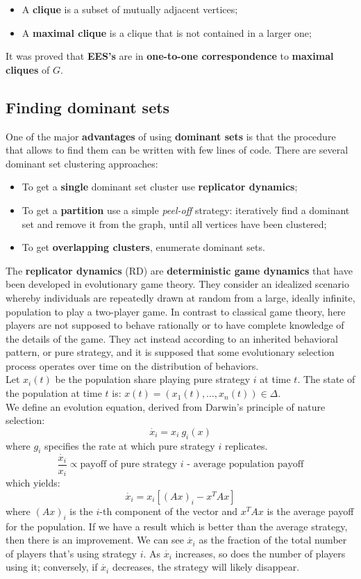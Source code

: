 \begin{itemize}
    \item A \textbf{clique} is a subset of mutually adjacent vertices;
    \item A \textbf{maximal clique} is a clique that is not contained in a larger one;
\end{itemize}

It was proved that \textbf{EES's} are in \textbf{one-to-one correspondence} to \textbf{maximal cliques} of $G$. 

\subsection{Finding dominant sets}
One of the major \textbf{advantages} of using \textbf{dominant sets} is that the procedure that allows to find them can be written with few lines of code. There are several dominant set clustering approaches:
\begin{itemize}
	\item To get a \textbf{single} dominant set cluster use \textbf{replicator dynamics};
	\item To get a \textbf{partition} use a simple \textit{peel-off} strategy: iteratively find a dominant set and remove it from the graph, until all vertices have been clustered;
	\item To get \textbf{overlapping clusters}, enumerate dominant sets. 
\end{itemize}
The \textbf{replicator dynamics} (RD) are \textbf{deterministic game dynamics} that have been developed in evolutionary game theory. They consider an idealized scenario whereby individuals are repeatedly drawn at random from a large, ideally infinite, population to play a two-player game. In contrast to classical game theory, here players are not supposed to behave rationally or to have complete knowledge of the details of the game. They act instead according to an inherited behavioral pattern, or pure strategy, and it is supposed that some evolutionary selection process operates over time on the distribution of behaviors.\\
Let $x_i(t)$ be the population share playing pure strategy $i$ at time $t$. The state of the population at time $t$ is: $x(t) = (x_1(t),\dots,x_n(t))\in\Delta$.\\
We define an evolution equation, derived from Darwin's principle of nature selection:
$$\dot{x_i} = x_i~g_i(x)$$
where $g_i$ specifies the rate at which pure strategy $i$ replicates.
$$\frac{\dot{x_i}}{x_i} \propto \text{payoff of pure strategy }i\text{ - average population payoff}$$
which yields:
$$\dot{x_i} = x_i[(Ax)_i - x^TAx]$$
where $(Ax)_i$ is the $i$-th component of the vector and $x^TAx$ is the average payoff for the population. If we have a result which is better than the average strategy, then there is an improvement.
We can see $\dot{x_i}$ as the fraction of the total number of players that's using strategy $i$. As $\dot{x_i}$ increases, so does the number of players using it; conversely, if $\dot{x_i}$ decreases, the strategy will likely disappear.  

